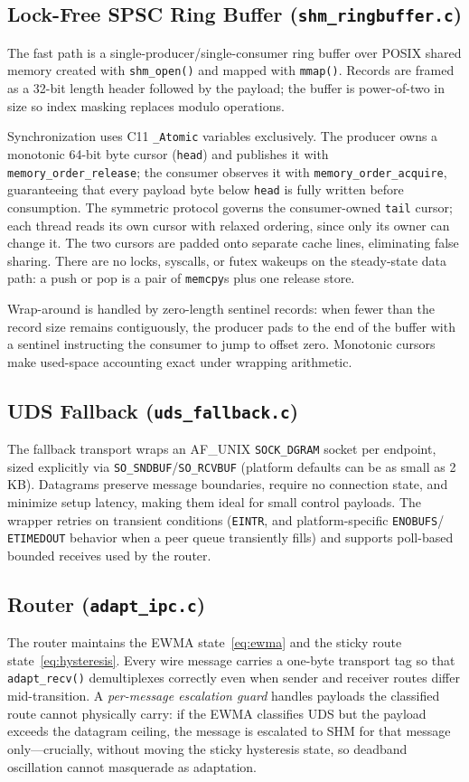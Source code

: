 \documentclass[conference]{IEEEtran}
\begin{document}
\subsection{Lock-Free SPSC Ring Buffer (\texttt{shm\_ringbuffer.c})}
The fast path is a single-producer/single-consumer ring buffer over POSIX
shared memory created with \texttt{shm\_open()} and mapped with
\texttt{mmap()}. Records are framed as a 32-bit length header followed by the
payload; the buffer is power-of-two in size so index masking replaces modulo
operations.

Synchronization uses C11 \texttt{\_Atomic} variables exclusively. The
producer owns a monotonic 64-bit byte cursor (\texttt{head}) and publishes it
with \texttt{memory\_order\_release}; the consumer observes it with
\texttt{memory\_order\_acquire}, guaranteeing that every payload byte below
\texttt{head} is fully written before consumption. The symmetric protocol
governs the consumer-owned \texttt{tail} cursor; each thread reads its own
cursor with relaxed ordering, since only its owner can change it. The two
cursors are padded onto separate cache lines, eliminating false sharing.
There are no locks, syscalls, or futex wakeups on the steady-state data path:
a push or pop is a pair of \texttt{memcpy}s plus one release store.

Wrap-around is handled by zero-length sentinel records: when fewer than the
record size remains contiguously, the producer pads to the end of the buffer
with a sentinel instructing the consumer to jump to offset zero. Monotonic
cursors make used-space accounting exact under wrapping arithmetic.

\subsection{UDS Fallback (\texttt{uds\_fallback.c})}
The fallback transport wraps an AF\_UNIX \texttt{SOCK\_DGRAM} socket per
endpoint, sized explicitly via \texttt{SO\_SNDBUF}/\texttt{SO\_RCVBUF}
(platform defaults can be as small as 2\,KB). Datagrams preserve message
boundaries, require no connection state, and minimize setup latency, making
them ideal for small control payloads. The wrapper retries on transient
conditions (\texttt{EINTR}, and platform-specific \texttt{ENOBUFS}/%
\texttt{ETIMEDOUT} behavior when a peer queue transiently fills) and supports
poll-based bounded receives used by the router.


\subsection{Router (\texttt{adapt\_ipc.c})}
The router maintains the EWMA state~\eqref{eq:ewma} and the sticky route
state~\eqref{eq:hysteresis}. Every wire message carries a one-byte transport
tag so that \texttt{adapt\_recv()} demultiplexes correctly even when sender
and receiver routes differ mid-transition. A \emph{per-message escalation
guard} handles payloads the classified route cannot physically carry: if the
EWMA classifies UDS but the payload exceeds the datagram ceiling, the message
is escalated to SHM for that message only---crucially, without moving the
sticky hysteresis state, so deadband oscillation cannot masquerade as
adaptation.
\end{document}
